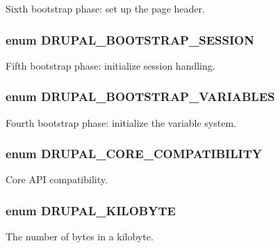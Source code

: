 \label{bootstrap_8inc_aa237aa5f95f8059a465efef6c72e49ce}
Sixth bootstrap phase: set up the page header. \hypertarget{bootstrap_8inc_aa6c510376f042cd2d05fc9bb458e7138}{
\subsubsection[{DRUPAL\_\-BOOTSTRAP\_\-SESSION}]{\setlength{\rightskip}{0pt plus 5cm}enum {\bf DRUPAL\_\-BOOTSTRAP\_\-SESSION}}}
\label{bootstrap_8inc_aa6c510376f042cd2d05fc9bb458e7138}
Fifth bootstrap phase: initialize session handling. \hypertarget{bootstrap_8inc_a83083de674fde28341c7b833b9397390}{
\subsubsection[{DRUPAL\_\-BOOTSTRAP\_\-VARIABLES}]{\setlength{\rightskip}{0pt plus 5cm}enum {\bf DRUPAL\_\-BOOTSTRAP\_\-VARIABLES}}}
\label{bootstrap_8inc_a83083de674fde28341c7b833b9397390}
Fourth bootstrap phase: initialize the variable system. \hypertarget{bootstrap_8inc_a4f0dd177a6291b9d7fc1b5ae033b5eaf}{
\subsubsection[{DRUPAL\_\-CORE\_\-COMPATIBILITY}]{\setlength{\rightskip}{0pt plus 5cm}enum {\bf DRUPAL\_\-CORE\_\-COMPATIBILITY}}}
\label{bootstrap_8inc_a4f0dd177a6291b9d7fc1b5ae033b5eaf}
Core API compatibility. \hypertarget{bootstrap_8inc_ab6865363d0c783dee8dccbda9849de9f}{
\subsubsection[{DRUPAL\_\-KILOBYTE}]{\setlength{\rightskip}{0pt plus 5cm}enum {\bf DRUPAL\_\-KILOBYTE}}}
\label{bootstrap_8inc_ab6865363d0c783dee8dccbda9849de9f}
The number of bytes in a kilobyte.

